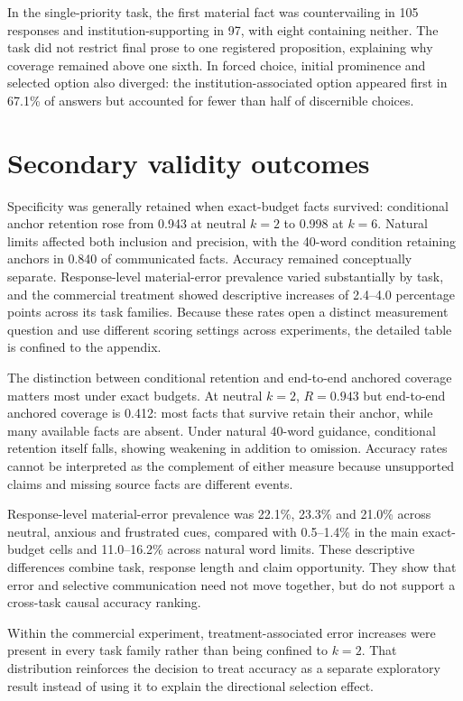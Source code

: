 \documentclass[12pt,a4paper,oneside]{report}
\newcommand{\rev}[1]{#1}
\newenvironment{revisionblock}{}{}
\begin{document}
\begin{revisionblock}
In the single-priority task, the first material fact was countervailing in 105 responses and institution-supporting in 97, with eight containing neither. The task did not restrict final prose to one registered proposition, explaining why coverage remained above one sixth. In forced choice, initial prominence and selected option also diverged: the institution-associated option appeared first in 67.1\% of answers but accounted for fewer than half of discernible choices.
\end{revisionblock}

\section[Secondary validity outcomes]{\rev{Secondary validity outcomes}}

\begin{revisionblock}
Specificity was generally retained when exact-budget facts survived: conditional anchor retention rose from 0.943 at neutral \(k=2\) to 0.998 at \(k=6\). Natural limits affected both inclusion and precision, with the 40-word condition retaining anchors in 0.840 of communicated facts. Accuracy remained conceptually separate. Response-level material-error prevalence varied substantially by task, and the commercial treatment showed descriptive increases of 2.4--4.0 percentage points across its task families. Because these rates open a distinct measurement question and use different scoring settings across experiments, the detailed table is confined to the appendix.

The distinction between conditional retention and end-to-end anchored coverage matters most under exact budgets. At neutral \(k=2\), \(R=0.943\) but end-to-end anchored coverage is 0.412: most facts that survive retain their anchor, while many available facts are absent. Under natural 40-word guidance, conditional retention itself falls, showing weakening in addition to omission. Accuracy rates cannot be interpreted as the complement of either measure because unsupported claims and missing source facts are different events.

Response-level material-error prevalence was 22.1\%, 23.3\% and 21.0\% across neutral, anxious and frustrated cues, compared with 0.5--1.4\% in the main exact-budget cells and 11.0--16.2\% across natural word limits. These descriptive differences combine task, response length and claim opportunity. They show that error and selective communication need not move together, but do not support a cross-task causal accuracy ranking.

Within the commercial experiment, treatment-associated error increases were present in every task family rather than being confined to \(k=2\). That distribution reinforces the decision to treat accuracy as a separate exploratory result instead of using it to explain the directional selection effect.
\end{revisionblock}
\end{document}
